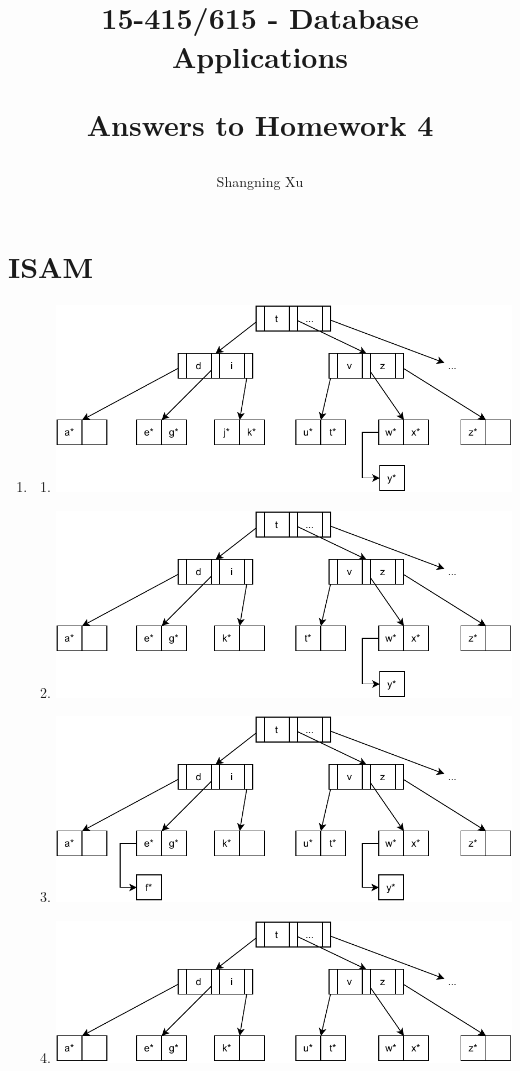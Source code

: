 \documentclass{article}
\title{
    15-415/615 - Database Applications

    Answers to Homework 4
}
\author{Shangning Xu}
\begin{document}
\maketitle

\newpage

\section{ISAM}

\begin{enumerate}
    \item \begin{enumerate}
        \item \includegraphics[width=\linewidth]{img/4-1-a-i.pdf}
        \item \includegraphics[width=\linewidth]{img/4-1-a-ii.pdf}
        \item \includegraphics[width=\linewidth]{img/4-1-a-iii.pdf}
        \item \includegraphics[width=\linewidth]{img/4-1-a-iv.pdf}
    \end{enumerate}


\end{enumerate}
\end{document}
